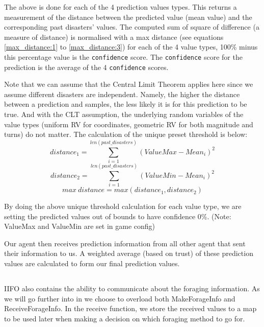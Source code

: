 The above is done for each of the 4 prediction values types. This returns a measurement of the distance between the predicted value (mean value) and the corresponding past disasters' values. The computed sum of square of difference (a measure of distance) is normalised with a max distance (see equations \ref{max_distance:1} to \ref{max_distance:3}) for each of the 4 value types, 100\% minus this percentage value is the \texttt{confidence} score. The \texttt{confidence} score for the prediction is the average of the 4 \texttt{confidence} scores.

Note that we can assume that the Central Limit Theorem applies here since we assume different disasters are independent. Namely, the higher the distance between a prediction and samples, the less likely it is for this prediction to be true. And with the CLT assumption, the underlying random variables of the value types (uniform RV for coordinates, geometric RV for both magnitude and turns) do not matter. The calculation of the unique preset threshold is below:
\begin{equation}\label{max_distance:1}
    distance_1 = \sum_{i=1}^{len(past\_disasters)}(ValueMax - Mean_i)^2
\end{equation}
\begin{equation}\label{max_distance:2}
    distance_2 = \sum_{i=1}^{len(past\_disasters)}(ValueMin - Mean_i)^2
\end{equation}
\begin{equation}\label{max_distance:3}
    max\: distance = max (distance_1, distance_2)
\end{equation}

By doing the above unique threshold calculation for each value type, we are setting the predicted values out of bounds to have confidence 0\%. (Note: ValueMax and ValueMin are set in game config)

Our agent then receives prediction information from all other agent that sent their information to us. A weighted average (based on trust) of these prediction values are calculated to form our final prediction values.



\subsection{} %
IIFO also contains the ability to communicate about the foraging information. As we will go further into in %
we choose to overload both MakeForageInfo and ReceiveForageInfo. In the receive function, we store the received values to a map to be used later when making a decision on which foraging method to go for. 


